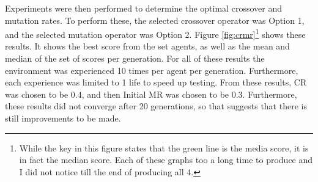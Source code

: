 Experiments were then performed to determine the optimal crossover and mutation rates. To perform these, the selected crossover operator was Option 1, and the selected mutation operator was Option 2. Figure \ref{fig:crmr}\footnote{While the key in this figure states that the green line is the media score, it is in fact the median score. Each of these graphs too a long time to produce and I did not notice till the end of producing all 4.} shows these results. It shows the best score from the set agents, as well as the mean and median of the set of scores per generation. For all of these results the environment was experienced 10 times per agent per generation. Furthermore, each experience was limited to 1 life to speed up testing. From these results, CR was chosen to be $0.4$, and then Initial MR was chosen to be $0.3$. Furthermore, these results did not converge after 20 generations, so that suggests that there is still improvements to be made.

